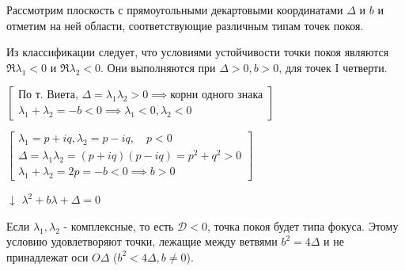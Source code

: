 Рассмотрим плоскость с прямоугольными декартовыми координатами $\Delta$ и $b$ и отметим на ней области, соответствующие различным типам точек покоя.

Из классификации следует, что условиями устойчивости точки покоя являются $\Re \lambda_1 < 0$ и $\Re \lambda_2 < 0$. Они выполняются при $\Delta > 0, b > 0$, для точек I четверти.

\vspace{0.5cm}
\noindent
\begin{minipage}{0.48\textwidth}
	\scriptsize
	\centering
	$\displaystyle[\begin{array}{l}
		\text{По т. Виета, } \Delta = \lambda_1 \lambda_2 > 0 \implies \text{корни одного знака} \\
		\lambda_1 + \lambda_2 = -b < 0 \implies \lambda_1 < 0, \lambda_2 < 0
	\end{array}]$
\end{minipage}\hfill
\begin{minipage}{0.48\textwidth}
	\scriptsize
	\centering
	$\displaystyle[\begin{array}{l}
		\lambda_1 = p+iq, \lambda_2 = p-iq, \quad p < 0 \\
		\Delta = \lambda_1 \lambda_2 = (p+iq)(p-iq) = p^2 + q^2 > 0 \\
		\lambda_1 + \lambda_2 = 2p = -b < 0 \implies b > 0
	\end{array}]$
\end{minipage}

\begin{center}
	$\downarrow$  $\lambda^2 + b\lambda + \Delta = 0$
\end{center}

Если $\lambda_1, \lambda_2$ - комплексные, то есть $\mathcal{D} < 0$, точка покоя будет типа фокуса. Этому условию удовлетворяют точки, лежащие между ветвями $b^2 = 4\Delta$ и не принадлежат оси $O\Delta$ ($b^2 < 4\Delta, b \neq 0$).

